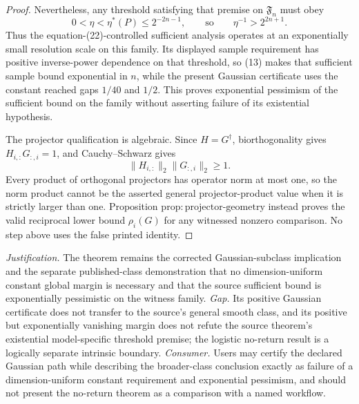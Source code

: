 \documentclass{article}
\begin{document}
\begin{proof}
Nevertheless, any threshold satisfying that premise on \(\mathfrak F_n\) must obey
\[
 0<\eta<\eta^{\ast}(P)\le2^{-2n-1},
 \qquad\text{so}\qquad
 \eta^{-1}>2^{2n+1}.
 \tag{13}
\]
Thus the equation-(22)-controlled sufficient analysis operates at an exponentially small resolution scale on this family.  Its displayed sample requirement has positive inverse-power dependence on that threshold, so (13) makes that sufficient sample bound exponential in \(n\), while the present Gaussian certificate uses the constant reached gaps \(1/40\) and \(1/2\).  This proves exponential pessimism of the sufficient bound on the family without asserting failure of its existential hypothesis.

The projector qualification is algebraic.  Since \(H=G^{\dagger}\), biorthogonality gives \(H_{i,:}G_{:,i}=1\), and Cauchy--Schwarz gives
\[
 \|H_{i,:}\|_2\|G_{:,i}\|_2\ge1.
\]
Every product of orthogonal projectors has operator norm at most one, so the norm product cannot be the asserted general projector-product value when it is strictly larger than one.  Proposition \(\mathrm{prop{:}projector\mbox{-}geometry}\) instead proves the valid reciprocal lower bound \(\rho_i(G)\) for any witnessed nonzero comparison.  No step above uses the false printed identity.
\end{proof}
\par\smallskip\noindent \textit{Justification.} The theorem remains the corrected Gaussian-subclass implication and the separate published-class demonstration that no dimension-uniform constant global margin is necessary and that the source sufficient bound is exponentially pessimistic on the witness family. \textit{Gap.} Its positive Gaussian certificate does not transfer to the source's general smooth class, and its positive but exponentially vanishing margin does not refute the source theorem's existential model-specific threshold premise; the logistic no-return result is a logically separate intrinsic boundary. \textit{Consumer.} Users may certify the declared Gaussian path while describing the broader-class conclusion exactly as failure of a dimension-uniform constant requirement and exponential pessimism, and should not present the no-return theorem as a comparison with a named workflow.
\end{document}

